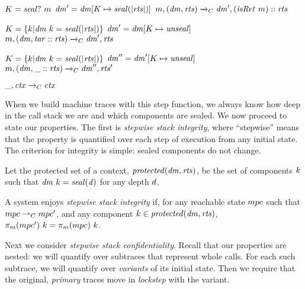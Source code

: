 \documentclass[acmsmall,review,anonymous]{acmart}\settopmatter{printfolios=true,printccs=false,printacmref=false}
\begin{document}
\judgmentthree[ Call]
              {\(\codemap ~ (\mach ~ \PCname)\)}
              {\(K = \mathit{seal?} ~ m\)}
              {\(\mathit{dm}' = \mathit{dm}[K \mapsto \mathit{seal(|\mathit{rts}|)}]\)}
                {\(m,(\mathit{dm},\mathit{rts}) \xrightarrow{}_C \mathit{dm}',(\mathit{isRet} ~ m)::\mathit{rts}\)}

\vspace*{-1ex}
              {\(K = \{k | \mathit{dm} ~ k = \mathit{seal(|\mathit{rts}|)}\}\)}
              {\(\mathit{dm}' = \mathit{dm}[K \mapsto \mathit{unseal}]\)}
              {\(m,(\mathit{dm},\mathit{tar}::\mathit{rts}) \xrightarrow{}_C \mathit{dm}',\mathit{rts}\)}

\vspace*{-1ex}
              {\(K = \{k | \mathit{dm} ~ k = \mathit{seal(|\mathit{rts}|)}\}\)}
              {\(\mathit{dm}'' = \mathit{dm}'[K \mapsto \mathit{unseal}]\)}
              {\(m,(\mathit{dm},\_::\mathit{rts}) \xrightarrow{}_C \mathit{dm}'',\mathit{rts}'\)}

\vspace*{-3.5ex}
\judgment[ Default]
         {}
         {\(\_,\mathit{ctx} \xrightarrow{}_C \mathit{ctx}\)}

When we build machine traces with this step function, we always know how deep in the
call stack we are and which components are sealed. We now proceed to state our properties.
The first is {\em stepwise stack integrity}, where ``stepwise'' means that the property is
quantified over each step of execution from any initial state. The criterion for integrity
is simple: sealed components do not change.

Let the protected set of a context, \(\mathit{protected}(\mathit{dm},\mathit{rts})\), be the
set of components \(k\) such that \(\mathit{dm} ~ k = \mathit{seal(d)}\)
for any depth \(d\).

A system enjoys {\em stepwise stack integrity} if, for any reachable state
\(mpc\) such that \(mpc \overset{}{\rightharpoonup}_C mpc'\),
and any component \(k \in \mathit{protected}(\mathit{dm},\mathit{rts})\),
\(\pi_m(mpc') ~ k = \pi_m(mpc) ~ k\).

Next we consider {\em stepwise stack confidentiality}. Recall that our properties are
nested: we will quantify over subtraces that represent whole calls. For each such
subtrace, we will quantify over {\em variants} of its initial state. Then we require
that the original, {\em primary} traces move in {\em lockstep} with the variant.
\end{document}
